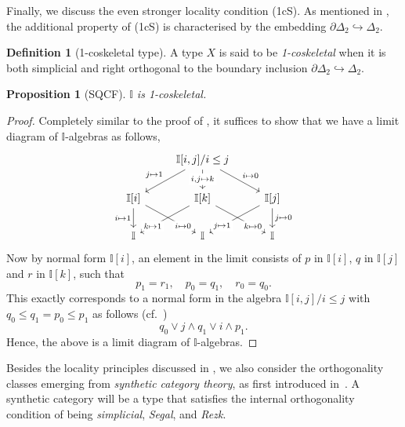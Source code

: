 \documentclass[12pt]{amsart}
\newtheorem{proposition}[theorem]{Proposition}
\theoremstyle{definition}
\newtheorem{definition}[theorem]{Definition}
\newcommand{\mbb}[1]{\mathbb{#1}}
\newcommand{\I}{\mbb I}
\newcommand{\hook}{\hookrightarrow}
\begin{document}
Finally, we discuss the even stronger locality condition (1cS). As mentioned in , the additional property of (1cS) is characterised by the embedding $\partial\Delta_2 \hook \Delta_2$.

\begin{definition}[1-coskeletal type]
  A type $X$ is said to be \emph{1-coskeletal} when it is both simplicial and right orthogonal to the boundary inclusion $\partial\Delta_2 \hook \Delta_2$.
\end{definition}

\begin{proposition}[SQCF]\label{specis1t}
  $\I$ is 1-coskeletal.
\end{proposition}
\begin{proof}
  Completely similar to the proof of , it suffices to show that we have a limit diagram of $\I$-algebras as follows,
  \[\begin{tikzcd}
    & {\I[i,j]/i\le j} \\
    \I[i] & \I[k] & \I[j] \\
    \I & \I & \I
    \arrow["{j \mapsto 1}"', from=1-2, to=2-1]
    \arrow["{i,j \mapsto k}"{description}, from=1-2, to=2-2]
    \arrow["{i \mapsto 0}", from=1-2, to=2-3]
    \arrow["i \mapsto 1"', from=2-1, to=3-1]
    \arrow["i \mapsto 0"{description, pos=0.75}, from=2-1, to=3-2]
    \arrow["k \mapsto 1"{description, pos=0.75}, from=2-2, to=3-1]
    \arrow["k \mapsto 0"{description, pos=0.75}, from=2-2, to=3-3]
    \arrow["j \mapsto 1"{description, pos=0.75}, from=2-3, to=3-2]
    \arrow["j \mapsto 0", from=2-3, to=3-3]
  \end{tikzcd}\]
  Now by normal form $\I[i]$, an element in the limit consists of $p$ in $\I[i]$, $q$ in $\I[j]$ and $r$ in $\I[k]$, such that
  \[ p_1 = r_1, \quad p_0 = q_1, \quad r_0 = q_0. \]
  This exactly corresponds to a normal form in the algebra $\I[i,j]/i\le j$ with $q_0 \le q_1 = p_0 \le p_1$ as follows (cf.\ )
  \[ q_0 \vee j \wedge q_1 \vee i \wedge p_1. \]
  Hence, the above is a limit diagram of $\I$-algebras.
\end{proof}

Besides the locality principles discussed in , we also consider the orthogonality classes emerging from \emph{synthetic category theory}, as first introduced in~\cite{riehl2017type}.  A synthetic category will be a type that satisfies the internal orthogonality condition of being \emph{simplicial}, \emph{Segal}, and \emph{Rezk}.
\end{document}
